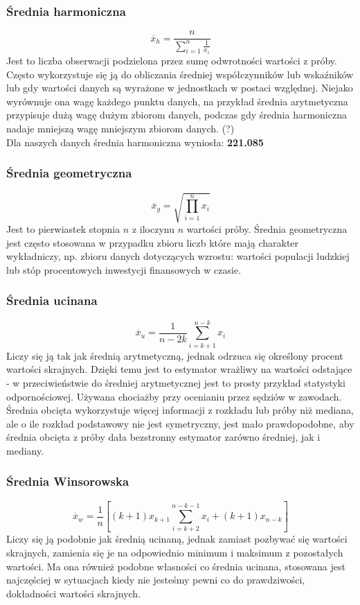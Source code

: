 \documentclass{article}
\theoremstyle{break}
\begin{document}
	\subsubsection{Średnia harmoniczna}
	$$\overline{x}_h=\frac{n}{\sum\limits_{i=1}^{n}\frac{1}{x_i}}$$
	Jest to liczba obserwacji podzielona przez sumę odwrotności wartości z próby. Często wykorzystuje się ją do obliczania średniej współczynników lub wskaźników lub gdy wartości danych są wyrażone w jednostkach w postaci względnej. Niejako wyrównuje ona wagę każdego punktu danych, na przykład średnia arytmetyczna przypisuje dużą wagę dużym zbiorom danych, podczas gdy średnia harmoniczna nadaje mniejszą wagę mniejszym zbiorom danych. (?) \\
	Dla naszych danych średnia harmoniczna wyniosła: \textbf{221.085}
	\subsubsection{Średnia geometryczna}
	$$\overline{x}_g=\sqrt{\prod\limits_{i=1}^{n}x_i}$$
	Jest to pierwiastek stopnia $n$ z iloczynu $n$ wartości próby. Średnia geometryczna jest często stosowana w przypadku zbioru liczb które mają charakter wykładniczy, np. zbioru danych dotyczących wzrostu: wartości populacji ludzkiej lub stóp procentowych inwestycji finansowych w czasie.
	\subsubsection{Średnia ucinana}
	$$\overline{x}_u=\frac{1}{n-2k}\sum\limits_{i=k+1}^{n-k}x_i$$
	Liczy się ją tak jak średnią arytmetyczną, jednak odrzuca się określony procent wartości skrajnych. Dzięki temu jest to estymator wrażliwy na wartości odstające - w przeciwieństwie do średniej arytmetycznej jest to prosty przykład statystyki odpornościowej. Używana chociażby przy ocenianiu przez sędziów w zawodach. Średnia obcięta wykorzystuje więcej informacji z rozkładu lub próby niż mediana, ale o ile rozkład podstawowy nie jest symetryczny, jest mało prawdopodobne, aby średnia obcięta z próby dała bezstronny estymator zarówno średniej, jak i mediany.
	\subsubsection{Średnia Winsorowska}
	$$\overline{x}_w=\frac{1}{n}[(k+1)x_{k+1}\sum\limits_{i=k+2}^{n-k-1}x_i +(k+1)x_{n-k}]$$
	Liczy się ją podobnie jak średnią ucinaną, jednak zamiast pozbywać się wartości skrajnych, zamienia się je na odpowiednio minimum i maksimum z pozostałych wartości. Ma ona również podobne własności co średnia ucinana, stosowana jest najczęściej w sytuacjach kiedy nie jesteśmy pewni co do prawdziwości, dokładności wartości skrajnych.
\end{document}
